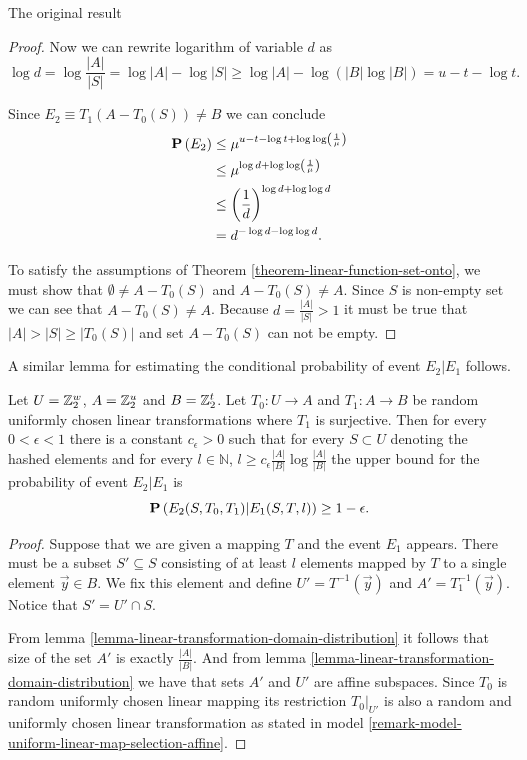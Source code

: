 \begin{section}{The original result}
\begin{proof}
Now we can rewrite logarithm of variable $d$ as 
\[
	\log d = \log \frac{|A|}{|S|} = \log |A| - \log |S| \geq \log |A| - \log (|B| \log |B|) = u - t - \log t \text{.}
\]

Since $E_2 \equiv T_1(A - T_0(S)) \neq B$ we can conclude
\[
\begin{split}
\mathbf{P}\left(E_2\right)
	& \leq \mu^{u - t - \log t + \log \log \left(\frac{1}{\mu}\right)} \\
	& \leq \mu ^ {\log d + \log \log \left(\frac{1}{\mu}\right)} \\
	& \leq \left(\frac{1}{d}\right) ^ {\log d + \log \log d} \\
	& = d ^ {-\log d - \log \log d} \text{.} \\
\end{split}
\]

To satisfy the assumptions of Theorem \ref{theorem-linear-function-set-onto}, we must show that $\emptyset \neq A - T_0(S)$ and $A - T_0(S) \neq A$. Since $S$ is non-empty set we can see that $A - T_0(S) \neq A$. Because $d = \frac{|A|}{|S|} > 1$ it must be true that $|A| > |S| \geq |T_0(S)|$ and set $A - T_0(S)$ can not be empty.
\end{proof}

A similar lemma for estimating the conditional probability of event $E_2 | E_1$ follows.
\begin{remark}
\label{remark-prob-l-length-chain}
Let $U = \mathbb{Z}_{2}^{w}$, $A = \mathbb{Z}_{2}^{u}$ and $B = \mathbb{Z}_{2}^{t}$. Let $T_0: U \rightarrow A$ and $T_1: A \rightarrow B$ be random uniformly chosen linear transformations where $T_1$ is surjective. Then for every $0 < \epsilon < 1$ there is a constant $c_{\epsilon} > 0$ such that for every $S \subset U$ denoting the hashed  elements and for every $l \in \mathbb{N}$, $l \geq c_{\epsilon}{\frac{|A|}{|B|}}\log\frac{|A|}{|B|}$ the upper bound for the probability of event $E_2 | E_1$ is
\[
	\mathbf{P}\left(E_2(S, T_0, T_1) | E_1(S, T, l)\right) \geq 1 - \epsilon \text{.}
\]
\end{remark}
\begin{proof}
Suppose that we are given a mapping $T$ and the event $E_1$ appears. There must be a subset $S' \subseteq S$ consisting of at least $l$ elements mapped by $T$ to a single element $\vec{y} \in B$. We fix this element and define $U' = T^{-1}(\vec{y})$ and $A' = T_1^{-1}(\vec{y})$. Notice that $S' = U' \cap S$.

From lemma \ref{lemma-linear-transformation-domain-distribution} it follows that size of the set $A'$ is exactly $\frac{|A|}{|B|}$. And from lemma \ref{lemma-linear-transformation-domain-distribution} we have that sets $A'$ and $U'$ are affine subspaces. Since $T_0$ is random uniformly chosen linear mapping its restriction $T_0|_{U'}$ is also a random and uniformly chosen linear transformation as stated in model \ref{remark-model-uniform-linear-map-selection-affine}.


\end{proof}
\end{section}
